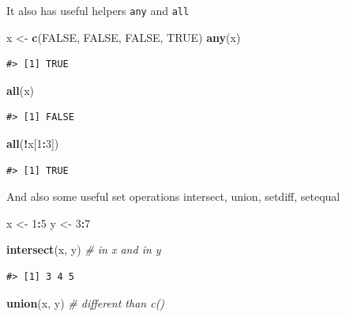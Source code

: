 \documentclass[]{book}
\newenvironment{Shaded}{\begin{snugshade}}{\end{snugshade}}
\newcommand{\KeywordTok}[1]{\textcolor[rgb]{0.13,0.29,0.53}{\textbf{#1}}}
\newcommand{\DecValTok}[1]{\textcolor[rgb]{0.00,0.00,0.81}{#1}}
\newcommand{\StringTok}[1]{\textcolor[rgb]{0.31,0.60,0.02}{#1}}
\newcommand{\CommentTok}[1]{\textcolor[rgb]{0.56,0.35,0.01}{\textit{#1}}}
\newcommand{\OtherTok}[1]{\textcolor[rgb]{0.56,0.35,0.01}{#1}}
\newcommand{\OperatorTok}[1]{\textcolor[rgb]{0.81,0.36,0.00}{\textbf{#1}}}
\newcommand{\NormalTok}[1]{#1}
\theoremstyle{definition}
\theoremstyle{definition}
\theoremstyle{definition}
\theoremstyle{remark}
\begin{document}
It also has useful helpers \texttt{any} and \texttt{all}

\begin{Shaded}
\begin{Highlighting}[]
\NormalTok{x <-}\StringTok{ }\KeywordTok{c}\NormalTok{(}\OtherTok{FALSE}\NormalTok{, }\OtherTok{FALSE}\NormalTok{, }\OtherTok{FALSE}\NormalTok{, }\OtherTok{TRUE}\NormalTok{)}
\KeywordTok{any}\NormalTok{(x)}
\end{Highlighting}
\end{Shaded}

\begin{verbatim}
#> [1] TRUE
\end{verbatim}

\begin{Shaded}
\begin{Highlighting}[]
\KeywordTok{all}\NormalTok{(x)}
\end{Highlighting}
\end{Shaded}

\begin{verbatim}
#> [1] FALSE
\end{verbatim}

\begin{Shaded}
\begin{Highlighting}[]
\KeywordTok{all}\NormalTok{(}\OperatorTok{!}\NormalTok{x[}\DecValTok{1}\OperatorTok{:}\DecValTok{3}\NormalTok{])}
\end{Highlighting}
\end{Shaded}

\begin{verbatim}
#> [1] TRUE
\end{verbatim}

And also some useful set operations intersect, union, setdiff, setequal

\begin{Shaded}
\begin{Highlighting}[]
\NormalTok{x <-}\StringTok{ }\DecValTok{1}\OperatorTok{:}\DecValTok{5}
\NormalTok{y <-}\StringTok{ }\DecValTok{3}\OperatorTok{:}\DecValTok{7}

\KeywordTok{intersect}\NormalTok{(x, y) }\CommentTok{# in x and in y}
\end{Highlighting}
\end{Shaded}

\begin{verbatim}
#> [1] 3 4 5
\end{verbatim}

\begin{Shaded}
\begin{Highlighting}[]
\KeywordTok{union}\NormalTok{(x, y)     }\CommentTok{# different than c()}
\end{Highlighting}
\end{Shaded}
\end{document}
